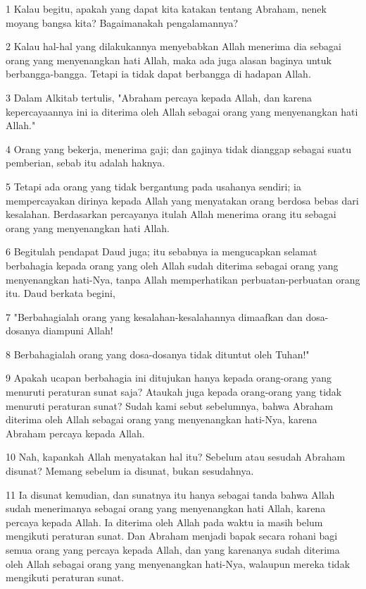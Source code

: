 \par 1 Kalau begitu, apakah yang dapat kita katakan tentang Abraham, nenek moyang bangsa kita? Bagaimanakah pengalamannya?
\par 2 Kalau hal-hal yang dilakukannya menyebabkan Allah menerima dia sebagai orang yang menyenangkan hati Allah, maka ada juga alasan baginya untuk berbangga-bangga. Tetapi ia tidak dapat berbangga di hadapan Allah.
\par 3 Dalam Alkitab tertulis, "Abraham percaya kepada Allah, dan karena kepercayaannya ini ia diterima oleh Allah sebagai orang yang menyenangkan hati Allah."
\par 4 Orang yang bekerja, menerima gaji; dan gajinya tidak dianggap sebagai suatu pemberian, sebab itu adalah haknya.
\par 5 Tetapi ada orang yang tidak bergantung pada usahanya sendiri; ia mempercayakan dirinya kepada Allah yang menyatakan orang berdosa bebas dari kesalahan. Berdasarkan percayanya itulah Allah menerima orang itu sebagai orang yang menyenangkan hati Allah.
\par 6 Begitulah pendapat Daud juga; itu sebabnya ia mengucapkan selamat berbahagia kepada orang yang oleh Allah sudah diterima sebagai orang yang menyenangkan hati-Nya, tanpa Allah memperhatikan perbuatan-perbuatan orang itu. Daud berkata begini,
\par 7 "Berbahagialah orang yang kesalahan-kesalahannya dimaafkan dan dosa-dosanya diampuni Allah!
\par 8 Berbahagialah orang yang dosa-dosanya tidak dituntut oleh Tuhan!"
\par 9 Apakah ucapan berbahagia ini ditujukan hanya kepada orang-orang yang menuruti peraturan sunat saja? Ataukah juga kepada orang-orang yang tidak menuruti peraturan sunat? Sudah kami sebut sebelumnya, bahwa Abraham diterima oleh Allah sebagai orang yang menyenangkan hati-Nya, karena Abraham percaya kepada Allah.
\par 10 Nah, kapankah Allah menyatakan hal itu? Sebelum atau sesudah Abraham disunat? Memang sebelum ia disunat, bukan sesudahnya.
\par 11 Ia disunat kemudian, dan sunatnya itu hanya sebagai tanda bahwa Allah sudah menerimanya sebagai orang yang menyenangkan hati Allah, karena percaya kepada Allah. Ia diterima oleh Allah pada waktu ia masih belum mengikuti peraturan sunat. Dan Abraham menjadi bapak secara rohani bagi semua orang yang percaya kepada Allah, dan yang karenanya sudah diterima oleh Allah sebagai orang yang menyenangkan hati-Nya, walaupun mereka tidak mengikuti peraturan sunat.
